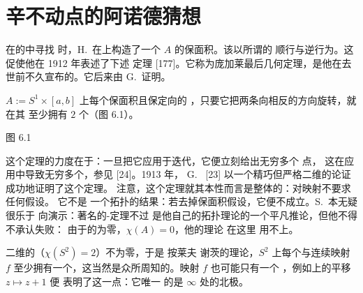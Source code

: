 
\section{辛不动点的阿诺德猜想}
\label{sec:arnold-conjecture}

在\trCelestialMechanics{}的\trRestrictedThreeBodyProblem{}中寻找%
\trPeriodicSolution{}时，H.~\trPoincare{}在\trEnergySurface{}上构造了一个%
\trAnnulus{} $A$ 的保面积\trSection\trMapping。该\trAnnulus{}以所谓的%
顺行与逆行\trPeriodicOrbit{}为\trBoundary。这促使他在 1912 年表述了下述%
定理 [177]。它称为庞加莱最后几何定理，是他在去世前不久宣布的。它后来由%
G.~\trBirkhoff{}证明。

\begin{theorem}[\trPoincare-\trBirkhoff]\label{thm:poincare-birkhoff}
\trAnnulus{} $A:=S^{1}\times[a,b]$ 上每个保面积且保定向的%
\trHomeomorphism，只要它把两条\trBoundary{}向相反的方向旋转，就在其%
\trInterior{}至少拥有 $2$ 个\trFixedPoint{}（图 6.1）。
\end{theorem}

\noindent\begin{minipage}{\linewidth}
\centering
{}

图 6.1
\end{minipage}

这个定理的力度在于：一旦把它应用于迭代，它便立刻给出无穷多个%
\trPeriodic{}点，%
这在应用中导致无穷多个\trPeriodicSolution，参见 [24]。1913 年，%
G.~\trBirkhoff{} [23] 以一个精巧但严格二维的论证成功地证明了这个定理。%
注意，这个定理就其本性而言是整体的：对映射不要求任何\trInterior{}假设。%
它不是%
一个拓扑的结果：若去掉保面积假设，它便不成立。S.~\trLefschetz{}本无疑很乐于%
向\trBirkhoff{}演示：著名的\trPoincare-\trBirkhoff\trFixedPoint{}定理不过%
是他自己的拓扑\trFixedPoint{}理论的一个平凡推论，但他不得不承认失败：%
由于\trAnnulus{}的\trEulerCharacteristic{}为零，$\chi(A)=0$，他的理论%
在这里%
用不上。

二维\trSphere{}的\trEulerCharacteristic{}（$\chi(S^{2})=2$）不为零，于是%
按莱夫%
谢茨的理论，$S^{2}$ 上每个与\trIdentityMap\trHomotopic{}连续映射 $f$%
至少拥有一个\trFixedPoint，这当然是众所周知的。映射 $f$ 也可能只有一个%
\trFixedPoint，例如\trRiemann{}\trSphere{}上的平移 $z\mapsto z+1$ 便%
表明了这一点：它唯一%
的\trFixedPoint{}是 $\infty$ 处的北极。

